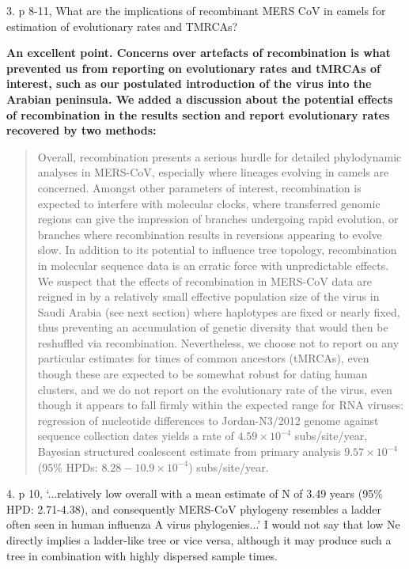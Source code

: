 \documentclass[11pt,oneside,letterpaper]{article}
\begin{document}
3. p 8-11, What are the implications of recombinant MERS CoV in camels for estimation of evolutionary rates and TMRCAs?

\textbf{An excellent point. Concerns over artefacts of recombination is what prevented us from reporting on evolutionary rates and tMRCAs of interest, such as our postulated introduction of the virus into the Arabian peninsula. We added a discussion about the potential effects of recombination in the results section and report evolutionary rates recovered by two methods:}

\begin{quotation}
Overall, recombination presents a serious hurdle for detailed phylodynamic analyses in MERS-CoV, especially where lineages evolving in camels are concerned.
Amongst other parameters of interest, recombination is expected to interfere with molecular clocks, where transferred genomic regions can give the impression of branches undergoing rapid evolution, or branches where recombination results in reversions appearing to evolve slow.
In addition to its potential to influence tree topology, recombination in molecular sequence data is an erratic force with unpredictable effects.
We suspect that the effects of recombination in MERS-CoV data are reigned in by a relatively small effective population size of the virus in Saudi Arabia (see next section) where haplotypes are fixed or nearly fixed, thus preventing an accumulation of genetic diversity that would then be reshuffled via recombination.
Nevertheless, we choose not to report on any particular estimates for times of common ancestors (tMRCAs), even though these are expected to be somewhat robust for dating human clusters, and we do not report on the evolutionary rate of the virus, even though it appears to fall firmly within the expected range for RNA viruses: regression of nucleotide differences to Jordan-N3/2012 genome against sequence collection dates yields a rate of $4.59 \times 10^{-4}$ subs/site/year, Bayesian structured coalescent estimate from primary analysis $9.57 \times 10^{-4}$ (95\% HPDs: $8.28-10.9 \times 10^{-4}$) subs/site/year.
\end{quotation}

4. p 10, `...relatively low overall with a mean estimate of N of 3.49 years (95\% HPD: 2.71-4.38), and consequently MERS-CoV phylogeny resembles a ladder often seen in human influenza A virus phylogenies...' I would not say that low Ne directly implies a ladder-like tree or vice versa, although it may produce such a tree in combination with highly dispersed sample times.
\end{document}
